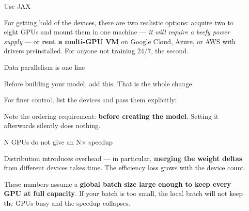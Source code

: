 \documentclass[aspectratio=169,11pt,t]{beamer}
\begin{document}
\begin{frame}[shrink=25]{Use JAX}
\begin{iquote}
\end{iquote}
{\fontsize{9.4}{12.6}\selectfont\color{fg2}For getting hold of the devices, there are two realistic options: acquire two to eight GPUs and mount them in one machine --- \textit{it will require a beefy power supply} --- or \textbf{rent a multi-GPU VM} on Google Cloud, Azure, or AWS with drivers preinstalled. For anyone not training 24/7, the second.\par}\vskip 4pt
\end{frame}

\begin{frame}[shrink=25]{Data parallelism is one line}
{\fontsize{9.4}{12.6}\selectfont\color{fg2}Before building your model, add this. That is the whole change.\par}\vskip 4pt
{\fontsize{9.4}{12.6}\selectfont\color{fg2}For finer control, list the devices and pass them explicitly:\par}\vskip 4pt
{\fontsize{9.4}{12.6}\selectfont\color{fg2}Note the ordering requirement: \textbf{before creating the model}. Setting it afterwards silently does nothing.\par}\vskip 4pt
\end{frame}

\begin{frame}[shrink=25]{N GPUs do not give an N$\times$ speedup}
\begin{minipage}[t]{0.3253\textwidth}
\end{minipage}%
\hfill
\begin{minipage}[t]{0.3253\textwidth}
\end{minipage}%
\hfill
\begin{minipage}[t]{0.3253\textwidth}
\end{minipage}%
{\fontsize{9.4}{12.6}\selectfont\color{fg2}Distribution introduces overhead --- in particular, \textbf{merging the weight deltas} from different devices takes time. The efficiency loss grows with the device count.\par}\vskip 4pt
\begin{iband}[amber]
These numbers assume a \textbf{global batch size large enough to keep every GPU at full capacity}. If your batch is too small, the local batch will not keep the GPUs busy and the speedup collapses.
\end{iband}
\end{frame}
\end{document}
